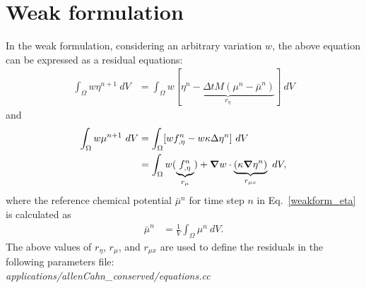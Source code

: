 \documentclass[10pt]{article}
\newcommand{\gv}[1]{\ensuremath{\mbox{\boldmath$ #1 $}}}
\newcommand{\grad}[1]{\gv{\nabla} #1}
\begin{document}
\section{Weak formulation}
In the weak formulation, considering an arbitrary variation $w$, the above equation can be expressed as a residual equations:
\begin{align}
\label{weakform_eta}
\int_{\Omega}   w \eta^{n+1} ~dV&= \int_{\Omega}  w [ \underbrace{ \eta^{n} - \Delta t M(\mu^n-\bar{\mu}^n)}_{r_{\eta}} ]~dV 
\end{align}
and
\begin{align}
\int_{\Omega}   w \mu^{n+1} ~dV&= \int_{\Omega} [w f_{,\eta}^n - w \kappa \Delta \eta^{n}]~dV \\
&= \int_{\Omega}   w ( \underbrace{ f_{,\eta}^{n} }_{r_{\mu}} )  + \grad w \cdot\underbrace{ (\kappa \grad \eta^{n})}_{r_{\mu x}} ~dV, 
\end{align}
where the reference chemical potential $\bar{\mu}^n$ for time step $n$ in Eq.~\eqref{weakform_eta} is calculated as
\begin{align}
\bar{\mu}^n& = \frac{1}{V}\int_\Omega \mu^n ~dV.
\end{align}
\vskip 0.25in
The above values of  $r_{\eta}$, $r_{\mu}$, and $r_{\mu x}$ are used to define the residuals in the following parameters file:\\
\textit{applications/allenCahn\_conserved/equations.cc}
\end{document}
